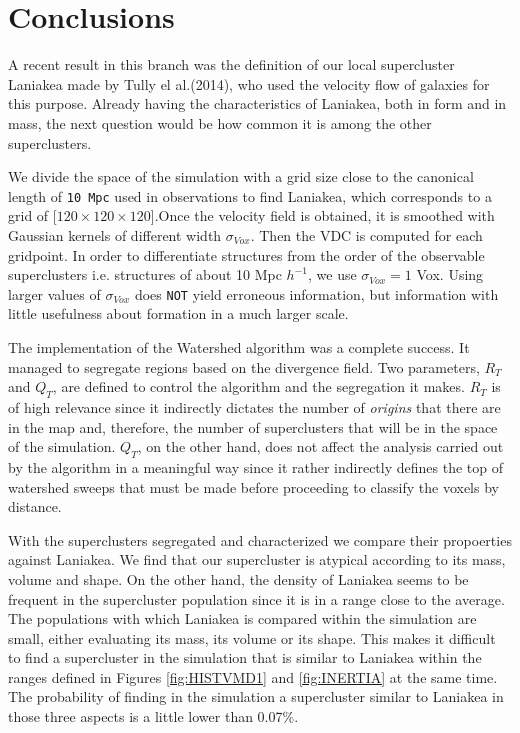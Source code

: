\documentclass[usenatbib]{mnras}
\begin{document}
\section{Conclusions}
\label{sec:conclusions}

A recent result in this branch was the definition of our local supercluster Laniakea made by Tully el al.(2014)\cite{tully_laniakea_2014}, who used the velocity flow of galaxies for this purpose. Already having the characteristics of Laniakea, both in form and in mass, the next question would be how common it is among the other superclusters.

We divide the space of the simulation with a grid size close to the canonical length of \texttt{10 Mpc} used in observations to find Laniakea, which corresponds to a grid of [$120 \times 120 \times 120$].Once the velocity field is obtained, it is smoothed with Gaussian kernels of different width $\sigma_{Vox}$. Then the VDC is computed for each gridpoint. In order to differentiate structures from the order of the observable superclusters i.e. structures of about 10 Mpc $h^{-1}$, we use $\sigma_{Vox} = 1$ Vox. Using larger values of $\sigma_{Vox}$ does \texttt{NOT} yield erroneous information, but information with little usefulness about formation in a much larger scale.  

The implementation of the Watershed algorithm was a complete success. It managed to segregate regions based on the divergence field. Two parameters, $R_T$ and $Q_T$, are defined to control the algorithm and the segregation it makes. $R_T$ is of high relevance since it indirectly dictates the number of \emph{origins} that there are in the map and, therefore, the number of superclusters that will be in the space of the simulation. $Q_T$, on the other hand, does not affect the analysis carried out by the algorithm in a meaningful way since it rather indirectly defines the top of watershed sweeps that must be made before proceeding to classify the voxels by distance.

With the superclusters segregated and characterized we compare their propoerties against Laniakea. We find that our supercluster is  atypical according to its mass, volume and shape. On the other hand, the density of Laniakea seems to be frequent in the supercluster population since it is in a range close to the average. The populations with which Laniakea is compared within the simulation are small, either evaluating its mass, its volume or its shape. This makes it difficult to find a supercluster in the simulation that is similar to Laniakea within the ranges defined in Figures \ref{fig:HISTVMD1} and \ref{fig:INERTIA} at the same time. The probability of finding in the simulation a supercluster similar to Laniakea in those three aspects is a little lower than 0.07\%.
\end{document}
